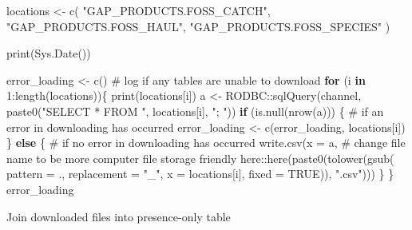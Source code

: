 \documentclass[
  letterpaper,
  oneside,
  open=any]{scrbook}
\newenvironment{Shaded}{\begin{snugshade}}{\end{snugshade}}
\newcommand{\AttributeTok}[1]{\textcolor[rgb]{0.40,0.45,0.13}{#1}}
\newcommand{\CommentTok}[1]{\textcolor[rgb]{0.37,0.37,0.37}{#1}}
\newcommand{\ConstantTok}[1]{\textcolor[rgb]{0.56,0.35,0.01}{#1}}
\newcommand{\ControlFlowTok}[1]{\textcolor[rgb]{0.00,0.23,0.31}{\textbf{#1}}}
\newcommand{\DecValTok}[1]{\textcolor[rgb]{0.68,0.00,0.00}{#1}}
\newcommand{\FunctionTok}[1]{\textcolor[rgb]{0.28,0.35,0.67}{#1}}
\newcommand{\NormalTok}[1]{\textcolor[rgb]{0.00,0.23,0.31}{#1}}
\newcommand{\OtherTok}[1]{\textcolor[rgb]{0.00,0.23,0.31}{#1}}
\newcommand{\SpecialCharTok}[1]{\textcolor[rgb]{0.37,0.37,0.37}{#1}}
\newcommand{\StringTok}[1]{\textcolor[rgb]{0.13,0.47,0.30}{#1}}
\begin{document}
\begin{Shaded}
\begin{Highlighting}[]
\NormalTok{locations }\OtherTok{\textless{}{-}} \FunctionTok{c}\NormalTok{(}
  \StringTok{"GAP\_PRODUCTS.FOSS\_CATCH"}\NormalTok{,}
  \StringTok{"GAP\_PRODUCTS.FOSS\_HAUL"}\NormalTok{,}
  \StringTok{"GAP\_PRODUCTS.FOSS\_SPECIES"}
\NormalTok{)}

\FunctionTok{print}\NormalTok{(}\FunctionTok{Sys.Date}\NormalTok{())}

\NormalTok{error\_loading }\OtherTok{\textless{}{-}} \FunctionTok{c}\NormalTok{() }\CommentTok{\# log if any tables are unable to download }
\ControlFlowTok{for}\NormalTok{ (i }\ControlFlowTok{in} \DecValTok{1}\SpecialCharTok{:}\FunctionTok{length}\NormalTok{(locations))\{}
  \FunctionTok{print}\NormalTok{(locations[i])}
\NormalTok{  a }\OtherTok{\textless{}{-}}\NormalTok{ RODBC}\SpecialCharTok{::}\FunctionTok{sqlQuery}\NormalTok{(channel, }\FunctionTok{paste0}\NormalTok{(}\StringTok{"SELECT * FROM "}\NormalTok{, locations[i], }\StringTok{"; "}\NormalTok{))}
  \ControlFlowTok{if}\NormalTok{ (}\FunctionTok{is.null}\NormalTok{(}\FunctionTok{nrow}\NormalTok{(a))) \{ }\CommentTok{\# if an error in downloading has occurred}
\NormalTok{    error\_loading }\OtherTok{\textless{}{-}} \FunctionTok{c}\NormalTok{(error\_loading, locations[i])}
\NormalTok{  \} }\ControlFlowTok{else}\NormalTok{ \{ }\CommentTok{\# if no error in downloading has occurred}
    \FunctionTok{write.csv}\NormalTok{(}\AttributeTok{x =}\NormalTok{ a, }
              \CommentTok{\# change file name to be more computer file storage friendly}
\NormalTok{              here}\SpecialCharTok{::}\FunctionTok{here}\NormalTok{(}\FunctionTok{paste0}\NormalTok{(}\FunctionTok{tolower}\NormalTok{(}\FunctionTok{gsub}\NormalTok{(}
                \AttributeTok{pattern =} \StringTok{\textquotesingle{}.\textquotesingle{}}\NormalTok{, }
                \AttributeTok{replacement =} \StringTok{"\_"}\NormalTok{, }
                \AttributeTok{x =}\NormalTok{ locations[i], }
                \AttributeTok{fixed =} \ConstantTok{TRUE}\NormalTok{)),}
                \StringTok{".csv"}\NormalTok{)))}
\NormalTok{  \}}
\NormalTok{\}}
\NormalTok{error\_loading}
\end{Highlighting}
\end{Shaded}

Join downloaded files into presence-only table
\end{document}
